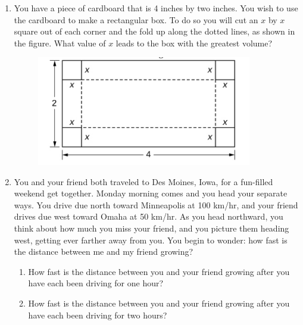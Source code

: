 \documentclass[12pt]{extarticle}
\begin{document}
\begin{enumerate}
\setlength{\itemsep}{3mm}

\item You have a piece of cardboard that is 4 inches by two
  inches. You wish to use the cardboard to make a rectangular box. To
  do so you will cut an $x$ by $x$ square out of each corner and the
  fold up along the dotted lines, as shown in the figure. What value
  of $x$ leads to the box with the greatest volume?

\begin{figure}[h!]
\begin{center}
\vspace{1mm}
\includegraphics[width=3.7in]{box.png}
\vspace{-2mm}
\label{fig:towns}
\vspace{-1mm}
\end{center}
\end{figure}

\item You and your friend both traveled to Des Moines, Iowa, for a
fun-filled weekend get together. Monday morning comes and you head your
separate ways. You drive due north toward Minneapolis at 100 km/hr,
and your friend drives due west toward Omaha at 50 km/hr. As you head
northward, you think about how much you miss your friend, and you
picture them heading west, getting ever farther away from you. You
begin to wonder: how fast is the distance between me and my friend
growing?

\begin{enumerate}

  \item How fast is the distance between you and your friend growing
    after you have each been driving for one hour?
    
  \item How fast is the distance between you and your friend growing
    after you have each been driving for two hours? \\


\end{enumerate}
\end{enumerate}
\end{document}
